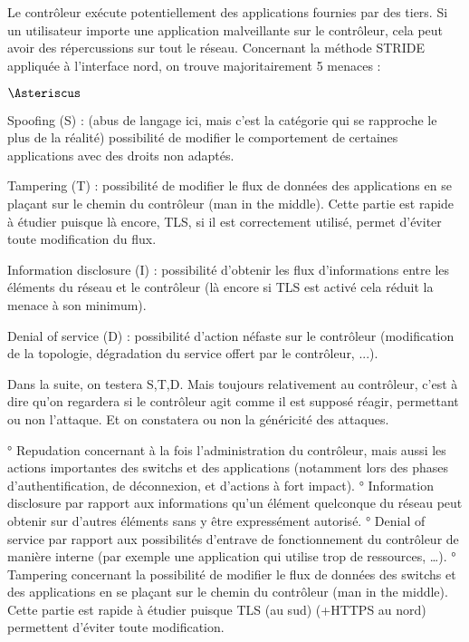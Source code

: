 Le contrôleur exécute potentiellement des applications fournies par des tiers. Si un utilisateur  importe une application malveillante sur le contrôleur, cela peut avoir des répercussions sur tout le réseau.
Concernant la méthode STRIDE appliquée à l'interface nord, on trouve majoritairement 5 menaces :

\begin{list}{$\Asteriscus$}{}

\item Spoofing (S) : (abus de langage ici, mais c'est la catégorie qui se rapproche le plus de la réalité) possibilité de modifier le comportement de certaines applications avec des droits non adaptés.

\item Tampering (T) : possibilité de modifier le flux de données des applications en se plaçant sur le chemin du contrôleur (man in the middle). Cette partie est rapide à étudier puisque là encore, TLS, si il est correctement utilisé, permet d’éviter toute modification du flux.

\item Information disclosure (I) : possibilité d’obtenir les flux d’informations entre les éléments du réseau et le contrôleur (là encore si TLS est activé cela réduit la menace à son minimum).

\item Denial of service (D) : possibilité d'action néfaste sur le contrôleur (modification de la topologie, dégradation du service offert par le contrôleur, ...).

\end{list}

Dans la suite, on testera S,T,D. Mais toujours relativement au contrôleur, c'est à dire qu'on regardera si le contrôleur agit comme il est supposé réagir, permettant ou non l'attaque. Et on constatera ou non la généricité des attaques.


° Repudation concernant à la fois l’administration du contrôleur, mais aussi les actions importantes des switchs et des applications (notamment lors des phases d’authentification, de déconnexion, et d’actions à fort impact).
° Information disclosure par rapport aux informations qu’un élément quelconque du réseau peut obtenir sur d’autres éléments sans y être expressément autorisé.
° Denial of service par rapport aux possibilités d’entrave de fonctionnement du contrôleur de manière interne (par exemple une application qui utilise trop de ressources, …).
° Tampering concernant la possibilité de modifier le flux de données des switchs et des applications en se plaçant sur le chemin du contrôleur (man in the middle). Cette partie est rapide à étudier puisque TLS (au sud) (+HTTPS au nord) permettent d’éviter toute modification.

